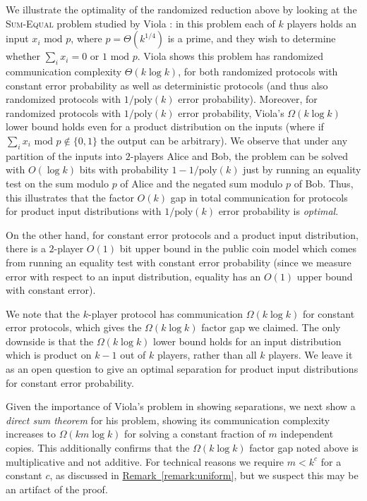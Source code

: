 \documentclass[11pt]{article}
\numberwithin{equation}{section}
\theoremstyle{definition}
\theoremstyle{plain}
\newcommand{\expref}[2]{\hyperref[#2]{#1~\ref{#2}}}
\renewcommand{\mod}{\text{ mod }}
\newcommand{\bigo}[1]{\ensuremath{{{O} \left( {#1} \right)}}}
\newcommand{\bigomega}[1]{\ensuremath{{\Omega \left( {#1} \right)}}}
\newcommand{\bigtheta}[1]{\ensuremath{{\Theta\left({#1} \right)}}}
\newcommand{\sumequal}{\textsc{Sum-Equal} }
\begin{document}
We illustrate the optimality of the randomized reduction above by
looking at the \sumequal problem studied by Viola \cite{Viola:2013we}:
in this problem each of $k$ players holds an input $x_i \mod p$, where
$p = \bigtheta{k^{1/4}}$ is a prime, and they wish to determine whether
$\sum_i x_i = 0$ or $1 \mod p$. Viola shows
this problem has randomized communication complexity $\bigtheta{k \log k}$, 
for both randomized protocols with constant error probability as well
as deterministic protocols (and thus also randomized protocols with
$1/\textrm{poly}(k)$ error probability). Moreover, for randomized protocols
with $1/\textrm{poly}(k)$ error probability, Viola's $\Omega(k \log k)$
lower bound holds even for a product distribution on the inputs (where
if $\sum_i x_i \mod p \notin \{0,1\}$ the output can be arbitrary).  
We observe that under any partition of the inputs into $2$-players
Alice and Bob,
the problem can be solved with $\bigo{\log k}$ bits with probability
$1-1/\textrm{poly}(k)$ just by running an equality test on the sum
modulo $p$ of Alice and the negated sum modulo $p$ of Bob. Thus, this
illustrates that the factor $O(k)$ gap in total communication for protocols for product input 
distributions with $1/\textrm{poly}(k)$ error probability is \emph{optimal}. 

On the other hand, for constant error protocols and a product input 
distribution, there is a 
$2$-player $\bigo{1}$ bit upper bound in the public coin model which comes
from running an equality test with constant error probability
(since we measure error with respect to an input distribution, equality
has an $O(1)$ upper bound with constant error). 

We note that the $k$-player protocol has communication $\bigomega{k \log k}$
for constant error protocols, 
which gives the $\bigomega{k \log k}$ factor gap we claimed. The only
downside is that the $\bigomega{k \log k}$ lower bound  holds for an input 
distribution which is product
on $k-1$ out of $k$ players, rather than all $k$ players. We leave it as an open question
to give an optimal separation for product input distributions for 
constant error probability. 


Given the importance of Viola's problem in showing separations, 
we next show a \emph{direct sum theorem} for his problem,
showing its communication complexity increases to $\bigomega{km \log k }$
for solving a constant fraction of $m$ independent copies. This additionally confirms that the $\Omega(k \log k)$ factor gap noted above is multiplicative and not additive. {\color{black}For technical reasons we require $m < k^c$ for a constant $c$, as discussed in \expref{Remark}{remark:uniform}, but we suspect this may be an artifact of the proof.}
\end{document}
